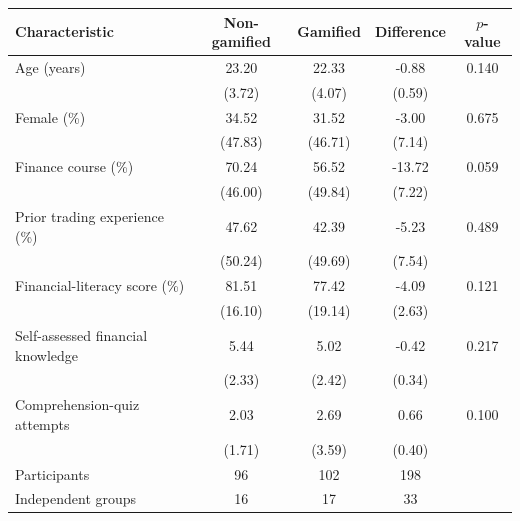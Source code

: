 \begin{tabular}{@{}lcccc@{}}
\midrule \midrule
Characteristic & Non-gamified & Gamified & Difference & $p$-value \\
\midrule
Age (years) & 23.20 & 22.33 & -0.88 & 0.140 \\
             & (3.72) & (4.07) & (0.59) & \\
Female (\%) & 34.52 & 31.52 & -3.00 & 0.675 \\
             & (47.83) & (46.71) & (7.14) & \\
Finance course (\%) & 70.24 & 56.52 & -13.72 & 0.059 \\
                     & (46.00) & (49.84) & (7.22) & \\
Prior trading experience (\%) & 47.62 & 42.39 & -5.23 & 0.489 \\
                               & (50.24) & (49.69) & (7.54) & \\
Financial-literacy score (\%) & 81.51 & 77.42 & -4.09 & 0.121 \\
                               & (16.10) & (19.14) & (2.63) & \\
Self-assessed financial knowledge & 5.44 & 5.02 & -0.42 & 0.217 \\
                                     & (2.33) & (2.42) & (0.34) & \\
Comprehension-quiz attempts & 2.03 & 2.69 & 0.66 & 0.100 \\
                             & (1.71) & (3.59) & (0.40) & \\
\midrule
Participants & 96 & 102 & 198 & \\
Independent groups & 16 & 17 & 33 & \\
\midrule \midrule
\end{tabular}
